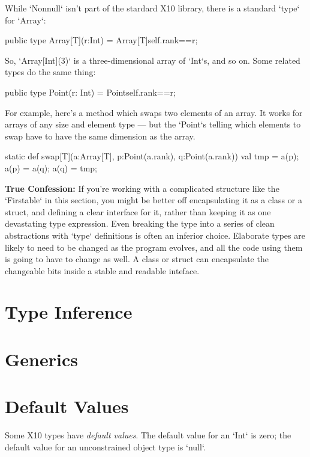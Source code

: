 While \xcd`Nonnull` isn't part of the stardard X10 library, there is a
standard \xcd`type` for \xcd`Array`: 
\begin{xten}
public type Array[T](r:Int) = Array[T]{self.rank==r};
\end{xten}
So, \xcd`Array[Int](3)` is a three-dimensional array of \xcd`Int`s, and so on.  
Some related types do the same thing: 
\begin{xten}
public type Point(r: Int) = Point{self.rank==r};
\end{xten}
For example, here's a method which swaps two elements of an array.  It works
for arrays of any size and element type --- but the \xcd`Point`s telling which
elements to swap have to have the same dimension as the array.  
\begin{xtennum}[]
static def swap[T](a:Array[T], p:Point(a.rank), q:Point(a.rank)) {
   val tmp = a(p);
   a(p) = a(q);
   a(q) = tmp;
}
\end{xtennum}



{\bf True Confession:} If you're working with a complicated structure like the
\xcd`Firstable` in this section, you might be better off encapsulating it as a
class or a struct, and defining a clear interface for it, rather than keeping
it as one devastating type expression.  Even breaking the type into a series
of clean abstractions with \xcd`type` definitions is often an inferior choice.
Elaborate types are likely to need to be changed as the program evolves, and
all the code using them is going to have to change as well.  A class or struct
can encapsulate the changeable bits inside a stable and readable inteface.


\section{Type Inference}

\section{Generics}

\section{Default Values}
\label{sect:DefaultValues}

Some X10 types have {\em default values}.  The default value for an \xcd`Int`
is zero; the default value for an unconstrained object type is \xcd`null`.  


